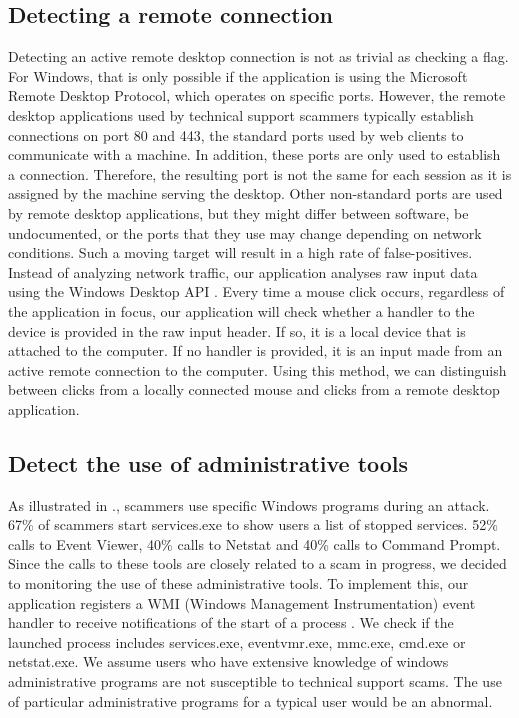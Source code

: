 \documentclass[final]{IEEEtran}
\begin{document}
\subsection{Detecting a remote connection}
Detecting an active remote desktop connection is not as trivial as checking a flag. For Windows, that is only possible if the application is using the Microsoft Remote Desktop Protocol, which operates on specific ports. However, the remote desktop applications used by technical support scammers typically establish connections on port 80 and 443, the standard ports used by web clients to communicate with a machine. In addition, these ports are only used to establish a connection. Therefore, the resulting port is not the same for each session as it is assigned by the machine serving the desktop. Other non-standard ports are used by remote desktop applications, but they might differ between software,  be undocumented, or the ports that they use may change depending on network conditions. Such a moving target will result in a high rate of false-positives. Instead of analyzing network traffic, our application analyses raw input data using the Windows Desktop API \cite {b4}. Every time a mouse click occurs, regardless of the application in focus, our application will check whether a handler to the device is provided in the raw input header. If so, it is a local device that is attached to the computer. If no handler is provided, it is an input made from an active remote connection to the computer. Using this method, we can distinguish between clicks from a locally connected mouse and clicks from a remote desktop application.

\subsection{Detect the use of administrative tools}
As illustrated in \cite[Fig 2]{b2}., scammers use specific Windows programs during an attack. 67\% of scammers start services.exe to show users a list of stopped services. 52\% calls to Event Viewer, 40\% calls to Netstat and 40\% calls to Command Prompt. Since the calls to these tools are closely related to a scam in progress, we decided to monitoring the use of these administrative tools. To implement this, our application registers a WMI (Windows Management Instrumentation) event handler to receive notifications of the start of a process \cite{b9}. We check if the launched process includes services.exe, eventvmr.exe, mmc.exe, cmd.exe or netstat.exe. We assume users who have extensive knowledge of windows administrative programs are not susceptible to technical support scams. The use of particular administrative programs for a typical user would be an abnormal.
\end{document}
